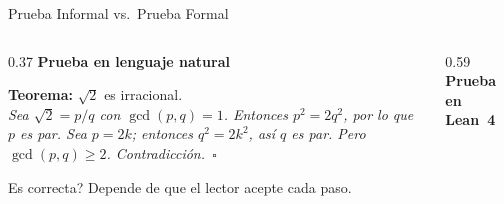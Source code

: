 \documentclass[aspectratio=169, 10pt]{beamer}
\begin{document}
\begin{frame}{Prueba Informal vs.\ Prueba Formal}
  \begin{columns}[T]
    \begin{column}{0.37\textwidth}
      {\color{cpGray}\bfseries\normalsize Prueba en lenguaje natural}
      \vspace{0.4cm}

      \colorbox{darkframe}{\parbox{\linewidth}{%
        \footnotesize
        \textbf{Teorema:} $\sqrt{2}$ es irracional.\\[0.4em]
        \itshape
        Sea $\sqrt{2} = p/q$ con $\gcd(p,q)=1$.
        Entonces $p^2 = 2q^2$, por lo que $p$ es par.
        Sea $p=2k$; entonces $q^2=2k^2$, as\'{i} $q$ es par.
        Pero $\gcd(p,q)\geq 2$. Contradicci\'{o}n.~$\square$
      }}\par\vspace{0.4cm}
      {\small\color{cpGray}\raggedright\textquestiondown Es correcta?
      Depende de que el lector acepte cada paso.}
    \end{column}
    \begin{column}{0.59\textwidth}
      {\color{leanpurple}\bfseries\normalsize Prueba en Lean~4}
      \vspace{0.4cm}


\end{column}
\end{columns}
\end{frame}
\end{document}
